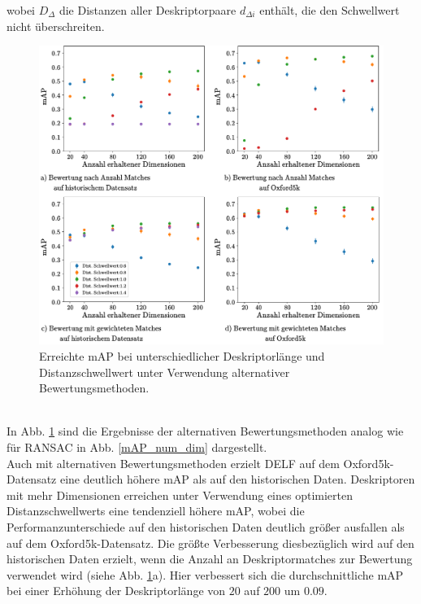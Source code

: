 wobei $D_\Delta$ die Distanzen aller Deskriptorpaare $d_{\Delta i}$ enthält, die den Schwellwert nicht überschreiten.
\begin{figure}[h]
\includegraphics[scale=0.73]{mAp_num_dim_scoring_methods}
\caption{Erreichte mAP bei unterschiedlicher Deskriptorlänge und Distanzschwellwert unter Verwendung alternativer Bewertungsmethoden.}
\label{mAP_num_dim_scoring_methods}
\end{figure}
\\
In Abb. \ref{mAP_num_dim_scoring_methods} sind die Ergebnisse der alternativen Bewertungsmethoden analog wie für RANSAC in Abb. \ref{mAP_num_dim} dargestellt.\\
Auch mit alternativen Bewertungsmethoden erzielt DELF auf dem Oxford5k-Datensatz eine deutlich höhere mAP als auf den historischen Daten. 
Deskriptoren mit mehr Dimensionen erreichen unter Verwendung eines optimierten Distanzschwellwerts eine tendenziell höhere mAP, wobei die Performanzunterschiede auf den historischen Daten deutlich größer ausfallen als auf dem Oxford5k-Datensatz. Die größte Verbesserung diesbezüglich wird auf den historischen Daten erzielt, wenn die Anzahl an Deskriptormatches zur Bewertung verwendet wird (siehe Abb. \ref{mAP_num_dim_scoring_methods}a). Hier verbessert sich die durchschnittliche mAP bei einer Erhöhung der Deskriptorlänge von $20$ auf $200$  um $0.09$.\\
